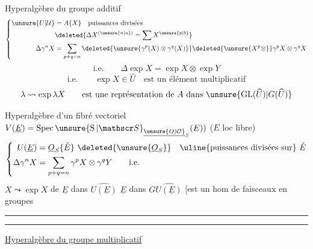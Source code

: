Hyperalgèbre du groupe additif
\[
\left\{
\begin{aligned}
\unsure{U|\mathcal U}&=A\{X\}\quad\text{puissances divisées}\\
&\deleted{\Delta X^{(\unsure{n|u})}=\sum X^{\unsure{p|b}}}\\
\Delta\gamma^nX&=\sum_{p+q=n}\deleted{\unsure{\gamma^p(X)\otimes\gamma^q(X)}}\deleted{\unsure{X^p\otimes}}\gamma^pX\otimes\gamma^qX
\end{aligned}\right.
\]
\[
\text{i.e.}\qquad\Delta\exp X=\exp X\otimes\exp Y
\]
\[
\text{i.e.}\qquad\exp X\in\widehat U\quad\text{est un élément multiplicatif}
\]
\[
\lambda\leadsto\exp\lambda X\qquad\text{est une représentation de }A\text{ dans }\unsure{\operatorname{GL}(\widehat U)|G(\widehat U)}
\]

Hyperalgèbre d'un  fibré vectoriel $V(\underline E)=\operatorname{Spec}\unsure{\operatorname{S}|\mathscr S}_{\underline{\unsure{O|\mathcal O}}_S}(E))$ ($E$ loc libre)
\[
\left\{
\begin{aligned}
U(\underline E)&=\underline O_S\{\check E\}\ \deleted{\unsure{\underline O_S}}\quad\text{\uline{puissances divisées sur}}\ \check E\\
\Delta\gamma^nX&=\sum_{p+q=n}\gamma^pX\otimes\gamma^qY\qquad\text{i.e.}
\end{aligned}\right.
\]
$X\leadsto\exp X$ de $\underline E$ dans $\widehat{U(\underline E)}$   $\underline E$ dans $G\widehat{U(\underline E)}$ [est un hom de faisceaux en groupes

\smallskip\hrule\smallskip\hrule\medskip
\uline{Hyperalgèbre du groupe multiplicatif}
